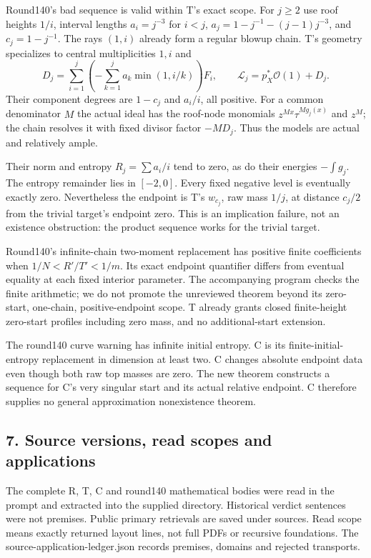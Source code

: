 \documentclass[
  11pt,
]{article}
\begin{document}
Round140's bad sequence is valid within T's exact scope. For \(j\ge2\)
use roof heights \(1/i\), interval lengths \(a_i=j^{-3}\) for \(i<j\),
\(a_j=1-j^{-1}-(j-1)j^{-3}\), and \(c_j=1-j^{-1}\). The rays \((1,i)\)
already form a regular blowup chain. T's geometry specializes to central
multiplicities \(1,i\) and \[
D_j=\sum_{i=1}^j\left(-\sum_{k=1}^j
 a_k\min(1,i/k)\right)F_i,\qquad
\mathcal L_j=p_X^*\mathcal O(1)+D_j.
\] Their component degrees are \(1-c_j\) and \(a_i/i\), all positive.
For a common denominator \(M\) the actual ideal has the roof-node
monomials \(z^{Mx}\tau^{Mg_j(x)}\) and \(z^M\); the chain resolves it
with fixed divisor factor \(-MD_j\). Thus the models are actual and
relatively ample.

Their norm and entropy \(R_j=\sum a_i/i\) tend to zero, as do their
energies \(-\int g_j\). The entropy remainder lies in \([-2,0]\). Every
fixed negative level is eventually exactly zero. Nevertheless the
endpoint is T's \(w_{c_j}\), raw mass \(1/j\), at distance \(c_j/2\)
from the trivial target's endpoint zero. This is an implication failure,
not an existence obstruction: the product sequence works for the trivial
target.

Round140's infinite-chain two-moment replacement has positive finite
coefficients when \(1/N<R'/T'<1/m\). Its exact endpoint quantifier
differs from eventual equality at each fixed interior parameter. The
accompanying program checks the finite arithmetic; we do not promote the
unreviewed theorem beyond its zero-start, one-chain, positive-endpoint
scope. T already grants closed finite-height zero-start profiles
including zero mass, and no additional-start extension.

The round140 curve warning has infinite initial entropy. C is its
finite-initial-entropy replacement in dimension at least two. C changes
absolute endpoint data even though both raw top masses are zero. The new
theorem constructs a sequence for C's very singular start and its actual
relative endpoint. C therefore supplies no general approximation
nonexistence theorem.

\subsection{7. Source versions, read scopes and
applications}\label{source-versions-read-scopes-and-applications}

The complete R, T, C and round140 mathematical bodies were read in the
prompt and extracted into the supplied directory. Historical verdict
sentences were not premises. Public primary retrievals are saved under
sources. Read scope means exactly returned layout lines, not full PDFs
or recursive foundations. The source-application-ledger.json records
premises, domains and rejected transports.
\end{document}
